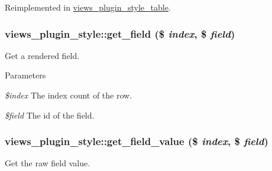 Reimplemented in \hyperlink{classviews__plugin__style__table_a6c1b6a4ddba95e72a3cc2dee0af9b92c}{views\_\-plugin\_\-style\_\-table}.\hypertarget{classviews__plugin__style_add1dccbb850840911c335ae09ff266d7}{
\subsubsection[{get\_\-field}]{\setlength{\rightskip}{0pt plus 5cm}views\_\-plugin\_\-style::get\_\-field (\$ {\em index}, \/  \$ {\em field})}}
\label{classviews__plugin__style_add1dccbb850840911c335ae09ff266d7}
Get a rendered field.


\begin{DoxyParams}{Parameters}
\item[{\em \$index}]The index count of the row. \item[{\em \$field}]The id of the field. \end{DoxyParams}
\hypertarget{classviews__plugin__style_a0af658171c8c1c5692a112f433de16c6}{
\subsubsection[{get\_\-field\_\-value}]{\setlength{\rightskip}{0pt plus 5cm}views\_\-plugin\_\-style::get\_\-field\_\-value (\$ {\em index}, \/  \$ {\em field})}}
\label{classviews__plugin__style_a0af658171c8c1c5692a112f433de16c6}
Get the raw field value.


